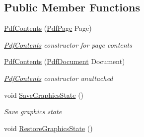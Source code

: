 \subsection*{Public Member Functions}
\begin{DoxyCompactItemize}
\item 
\hyperlink{class_pdf_file_writer_1_1_pdf_contents_aec0851610b9b9ee51171fcb1fb6bcbe6}{Pdf\+Contents} (\hyperlink{class_pdf_file_writer_1_1_pdf_page}{Pdf\+Page} Page)
\begin{DoxyCompactList}\small\item\em \hyperlink{class_pdf_file_writer_1_1_pdf_contents}{Pdf\+Contents} constructor for page contents \end{DoxyCompactList}\item 
\hyperlink{class_pdf_file_writer_1_1_pdf_contents_a2eabad150d9646599f90f16d3e6e3795}{Pdf\+Contents} (\hyperlink{class_pdf_file_writer_1_1_pdf_document}{Pdf\+Document} Document)
\begin{DoxyCompactList}\small\item\em \hyperlink{class_pdf_file_writer_1_1_pdf_contents}{Pdf\+Contents} constructor unattached \end{DoxyCompactList}\item 
void \hyperlink{class_pdf_file_writer_1_1_pdf_contents_adb8e2edc2e0d9c903a15dfa6837f0561}{Save\+Graphics\+State} ()\hypertarget{class_pdf_file_writer_1_1_pdf_contents_adb8e2edc2e0d9c903a15dfa6837f0561}{}\label{class_pdf_file_writer_1_1_pdf_contents_adb8e2edc2e0d9c903a15dfa6837f0561}

\begin{DoxyCompactList}\small\item\em Save graphics state \end{DoxyCompactList}\item 
void \hyperlink{class_pdf_file_writer_1_1_pdf_contents_a842822ecf394249f6269e24b291fd7bd}{Restore\+Graphics\+State} ()\hypertarget{class_pdf_file_writer_1_1_pdf_contents_a842822ecf394249f6269e24b291fd7bd}{}\label{class_pdf_file_writer_1_1_pdf_contents_a842822ecf394249f6269e24b291fd7bd}


\end{DoxyCompactItemize}
